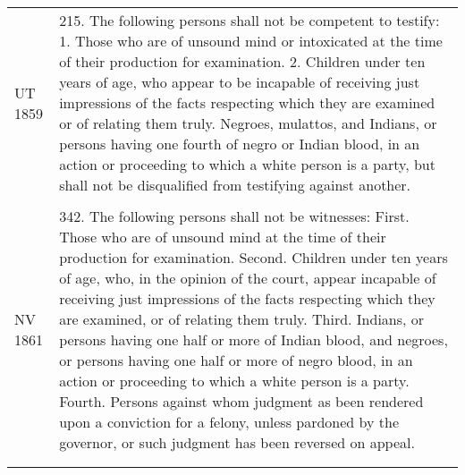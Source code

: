 \documentclass[12pt,]{article}
\begin{document}
\begin{longtable}[]{@{}ll@{}}
\begin{minipage}[t]{0.17\columnwidth}\raggedright
UT 1859\strut
\end{minipage} & \begin{minipage}[t]{0.77\columnwidth}\raggedright
215. The following persons shall not be competent to testify: 1. Those
who are of unsound mind or intoxicated at the time of their production
for examination. 2. Children under ten years of age, who appear to be
incapable of receiving just impressions of the facts respecting which
they are examined or of relating them truly. Negroes, mulattos, and
Indians, or persons having one fourth of negro or Indian blood, in an
action or proceeding to which a white person is a party, but shall not
be disqualified from testifying against another.\strut
\end{minipage}\tabularnewline
\begin{minipage}[t]{0.17\columnwidth}\raggedright
\strut
\end{minipage} & \begin{minipage}[t]{0.77\columnwidth}\raggedright
\strut
\end{minipage}\tabularnewline
\begin{minipage}[t]{0.17\columnwidth}\raggedright
NV 1861\strut
\end{minipage} & \begin{minipage}[t]{0.77\columnwidth}\raggedright
342. The following persons shall not be witnesses: First. Those who are
of unsound mind at the time of their production for examination. Second.
Children under ten years of age, who, in the opinion of the court,
appear incapable of receiving just impressions of the facts respecting
which they are examined, or of relating them truly. Third. Indians, or
persons having one half or more of Indian blood, and negroes, or persons
having one half or more of negro blood, in an action or proceeding to
which a white person is a party. Fourth. Persons against whom judgment
as been rendered upon a conviction for a felony, unless pardoned by the
governor, or such judgment has been reversed on appeal.\strut
\end{minipage}\tabularnewline
\begin{minipage}[t]{0.17\columnwidth}\raggedright
\strut
\end{minipage} & \begin{minipage}[t]{0.77\columnwidth}\raggedright
\strut
\end{minipage}\tabularnewline
\begin{minipage}[t]{0.17\columnwidth}\raggedright

\end{minipage}
\end{longtable}
\end{document}

